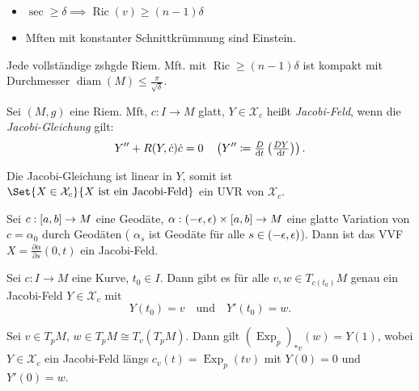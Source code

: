 \documentclass{cheat-sheet}
\DeclareMathOperator{\Exp}{Exp} %
\newcommand{\vinterval}{\ointerval{-\epsilon}{\epsilon}} %
\DeclareMathOperator{\diam}{diam} %
\DeclareMathOperator{\Ric}{Ric} %
\newcommand{\abinterval}{\cinterval{a}{b}} %
\newcommand{\VF}{\mathcal{X}} %
\begin{document}
\begin{beob}
  \begin{itemize}
    \item $\sec \geq \delta \implies \Ric(v) \geq (n{-}1) \delta$
    \item Mften mit konstanter Schnittkrümmung sind Einstein.
  \end{itemize}
\end{beob}

\begin{satz}
  Jede vollständige zshgde Riem. Mft. mit $\Ric \geq (n{-}1)\delta$ ist kompakt mit Durchmesser $\diam(M) \leq \tfrac{\pi}{\sqrt{\delta}}$.
\end{satz}


\begin{defn}
  Sei $(M, g)$ eine Riem. Mft, $c : I \to M$ glatt, $Y \in \VF_c$ heißt \emph{Jacobi-Feld}, wenn die \emph{Jacobi-Gleichung} gilt:
  \[
    Y'' + R(Y, \dot{c}) \dot{c} = 0 \quad
    \left( Y'' \coloneqq \tfrac{D}{\mathrm{d} t} \left( \tfrac{D Y}{\mathrm{d} t} \right) \right).
  \]
\end{defn}

\begin{bem}
  Die Jacobi-Gleichung ist linear in $Y$, somit ist $\Set{ X \in \VF_c }{ X \text{ ist ein Jacobi-Feld} }$ ein UVR von $\VF_c$.
\end{bem}

\begin{satz}
  Sei $c : \abinterval \to M$ eine Geodäte, $\alpha : \vinterval \times \abinterval \to M$ eine glatte Variation von $c = \alpha_0$ durch Geodäten (\dh{} $\alpha_s$ ist Geodäte für alle $s \in \vinterval$). Dann ist das VVF $X = \tfrac{\partial \alpha}{\partial s}(0,t)$ ein Jacobi-Feld.
\end{satz}

\begin{satz}
  Sei $c : I \to M$ eine Kurve, $t_0 \in I$. Dann gibt es für alle $v, w \in T_{c(t_0)} M$ genau ein Jacobi-Feld $Y \in \VF_c$ mit
  \[
    Y(t_0) = v
    \quad \text{und} \quad
    Y'(t_0) = w.
  \]
\end{satz}

\begin{satz}
  Sei $v \in T_p M$, $w \in T_p M \cong T_v \left( T_p M \right)$. Dann gilt $(\Exp_p)_{*v}(w) = Y(1)$, wobei $Y \in \VF_c$ ein Jacobi-Feld längs $c_v(t) = \Exp_p(tv)$ mit $Y(0) = 0$ und $Y'(0) = w$.
\end{satz}
\end{document}
